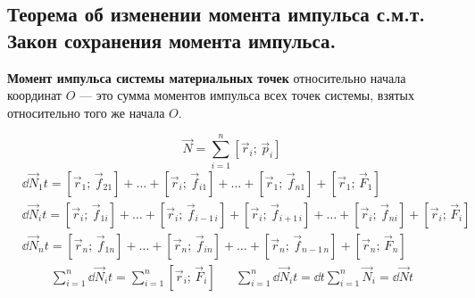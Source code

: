 \subsection{\textbf{Теорема об изменении момента импульса с.м.т.} Закон сохранения момента импульса.}

\textbf{Момент импульса системы материальных точек} относительно начала координат $O$ — это сумма моментов импульса всех точек системы, взятых относительно того же начала $O$.

\[\vec{N} = \sum_{i=1}^{n} [\vec{r}_i; \, \vec{p}_i]\]
\begin{align*}
	&\dd{\vec{N}_1}{t} = [\vec{r}_1; \, \vec{f}_{21}] + \dots + [\vec{r}_i; \, \vec{f}_{i1}] + \dots + [\vec{r}_1; \, \vec{f}_{n1}] + [\vec{r}_1; \, \vec{F}_{1}] \\
	&\dd{\vec{N}_i}{t} = [\vec{r}_i; \, \vec{f}_{1i}] + \dots + [\vec{r}_i; \, \vec{f}_{i-1 \, i}] + [\vec{r}_i; \, \vec{f}_{i+1 \, i}] + \dots + [\vec{r}_i; \, \vec{f}_{ni}] + [\vec{r}_i; \, \vec{F}_{i}] \\
	&\dd{\vec{N}_n}{t} = [\vec{r}_n; \, \vec{f}_{1n}] + \dots + [\vec{r}_n; \, \vec{f}_{in}] + \dots + [\vec{r}_n; \, \vec{f}_{n-1 \, n}] + [\vec{r}_n; \, \vec{F}_{n}]
\end{align*}
\begin{align*}
	\sum_{i=1}^{n} \dd{\vec{N}_i}{t} = \sum_{i=1}^{n} [\vec{r}_i; \, \vec{F}_i] && \sum_{i=1}^{n} \dd{\vec{N}_i}{t} = \dd{}{t} \sum_{i=1}^{n} \vec{N}_i = \dd{\vec{N}}{t}
\end{align*}